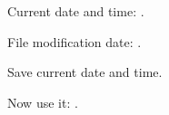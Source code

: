 \documentclass{article}
\begin{document}
Current date and time: \DTMnow.


File modification date: .

Save current date and time.

Now use it: .
\end{document}
